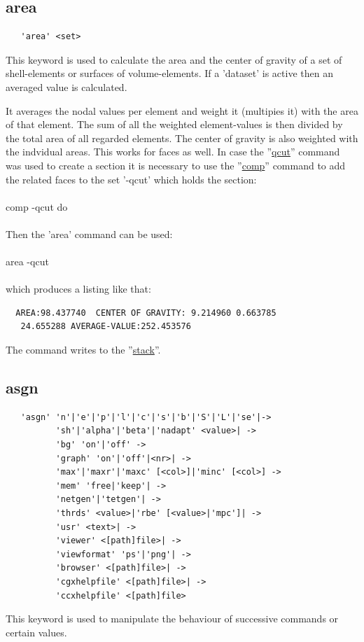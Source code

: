 \documentclass{article}
\providecommand{\htmlref}[2]{\hyperref[#2]{#1}}
\begin{document}
\subsection{\label{area}area}
\begin{verbatim}
   'area' <set> 
\end{verbatim}
This keyword is used to calculate the area and the center of gravity of a set of shell-elements or surfaces of volume-elements. If a 'dataset' is active then an averaged value is calculated.

It averages the nodal values per element and weight it (multipies it) with the area of that element. The sum of all the weighted element-values is then divided by the total area of all regarded elements. The center of gravity is also weighted with the indvidual areas. This works for faces as well. In case the ''\htmlref{qcut}{qcut}'' command was used to create a section it is necessary to use the ''\htmlref{comp}{comp}'' command to add the related faces to the set '-qcut' which holds the section:\\\\comp -qcut do\\\\Then the 'area' command can be used:\\\\area -qcut\\\\which produces a listing like that:
\begin{verbatim}
  AREA:98.437740  CENTER OF GRAVITY: 9.214960 0.663785
   24.655288 AVERAGE-VALUE:252.453576
\end{verbatim}

The command writes to the ''\htmlref{stack}{stack}''.

\subsection{\label{asgn}asgn}
\begin{verbatim}
   'asgn' 'n'|'e'|'p'|'l'|'c'|'s'|'b'|'S'|'L'|'se'|->
          'sh'|'alpha'|'beta'|'nadapt' <value>| ->
          'bg' 'on'|'off' ->
          'graph' 'on'|'off'|<nr>| ->
          'max'|'maxr'|'maxc' [<col>]|'minc' [<col>] ->
          'mem' 'free|'keep'| ->
          'netgen'|'tetgen'| ->
          'thrds' <value>|'rbe' [<value>|'mpc']| ->
          'usr' <text>| ->
          'viewer' <[path]file>| ->
          'viewformat' 'ps'|'png'| ->
          'browser' <[path]file>| ->
          'cgxhelpfile' <[path]file>| ->
          'ccxhelpfile' <[path]file>
\end{verbatim}
This keyword is used to manipulate the behaviour of successive commands or certain values.
\end{document}
